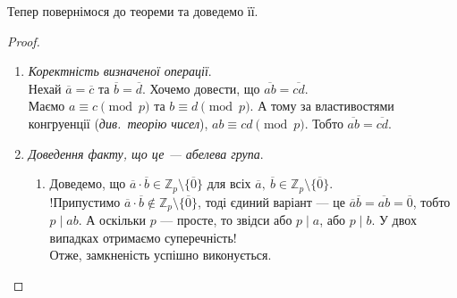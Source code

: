 \documentclass{math_library}
\begin{document}
Тепер повернімося до теореми та доведемо її.
\begin{proof}
\begin{enumerate}[topsep=0pt,wide=0pt,label={\Roman*.}]
\item \textit{Коректність визначеної операції}.\\
Нехай $\overline{a} = \overline{c}$ та $\overline{b} = \overline{d}$. Хочемо довести, що $\overline{ab} = \overline{cd}$.\\
Маємо $a \equiv c \pmod p$ та $b \equiv d \pmod p$. А тому за властивостями конгруенції (\textit{див.~теорію чисел}), $ab \equiv cd \pmod p$. Тобто $\overline{ab} = \overline{cd}$.

\item \textit{Доведення факту, що це --- абелева група}.
\begin{enumerate}[nosep,wide=0pt,label={\roman*.}]
\item Доведемо, що $\overline{a} \cdot \overline{b} \in \mathbb{Z}_p \setminus \{ \overline{0}\}$ для всіх $\overline{a},\ \overline{b} \in \mathbb{Z}_p \setminus \{ \overline{0}\}$.\\
!Припустимо $\overline{a} \cdot \overline{b} \not\in \mathbb{Z}_p \setminus \{ \overline{0}\}$, тоді єдиний варіант --- це $\overline{a} \overline{b} = \overline{ab} = \overline{0}$, тобто $p \mid ab$. А оскільки $p$ --- просте, то звідси або $p \mid a$, або $p \mid b$. У двох випадках отримаємо суперечність!\\
Отже, замкненість успішно виконується.


\end{enumerate}
\end{enumerate}
\end{proof}
\end{document}
